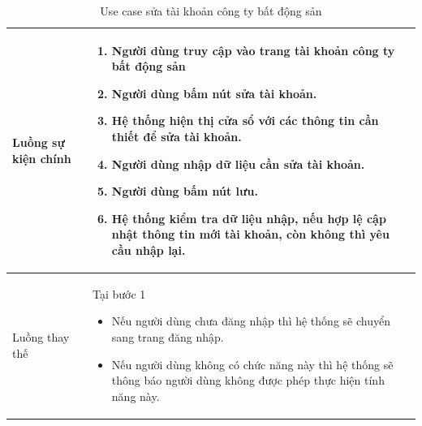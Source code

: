 \documentclass[12pt,a4paper]{article}
\begin{document}
\begin{table}[H]
\begin{tabular}{|p{3.5cm}|p{11.5cm}|c|}
            Luồng sự kiện chính & \vspace{-.8cm}\begin{enumerate}
                                                    \item Người dùng truy cập vào trang tài khoản công ty bất động sản
                                                    \item  Người dùng bấm nút sửa tài khoản.
                                                    \item  Hệ thống hiện thị cửa sổ với các thông tin cần thiết để sửa tài khoản.
                                                    \item  Người dùng nhập dữ liệu cần sửa tài khoản.
                                                    \item Người dùng bấm nút lưu.
                                                    \item Hệ thống kiểm tra dữ liệu nhập, nếu hợp lệ cập nhật thông tin mới tài khoản, còn không thì yêu cầu nhập lại.
            \end{enumerate}
            \\
            \hline
            Luồng thay thế & Tại bước 1\newline
            \vspace{-.8cm}\begin{itemize}
                              \item Nếu người dùng chưa đăng nhập thì hệ thống sẽ chuyển sang trang đăng nhập.
                              \item  Nếu người dùng không có chức năng này thì hệ thống sẽ thông báo người dùng không được phép thực hiện tính năng này.
            \end{itemize}
            \\
            \hline
        \end{tabular}
        \caption{Use case sửa tài khoản công ty bất động sản }
    \end{table}


\end{document}
